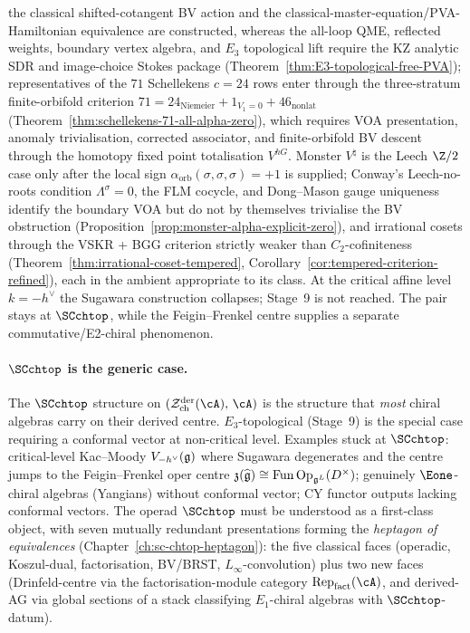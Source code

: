 the classical shifted-cotangent BV action and the
classical-master-equation/PVA-Hamiltonian equivalence are constructed,
whereas the all-loop QME, reflected weights, boundary vertex algebra,
and $E_3$ topological lift require the KZ analytic SDR and
image-choice Stokes package
(Theorem~\ref{thm:E3-topological-free-PVA}); representatives of the
$71$ Schellekens $c = 24$
rows enter through the three-stratum finite-orbifold criterion
$71 = 24_{\mathrm{Niemeier}} + 1_{V_1=0} + 46_{\mathrm{nonlat}}$
(Theorem~\ref{thm:schellekens-71-all-alpha-zero}), which requires
VOA presentation, anomaly trivialisation, corrected associator, and
finite-orbifold BV descent through the homotopy fixed point
totalisation $V^{hG}$. Monster $V^\natural$ is the Leech $\Z/2$ case only after
the local sign
$\alpha_{\mathrm{orb}}(\sigma,\sigma,\sigma)=+1$ is supplied;
Conway's Leech-no-roots condition $\Lambda^\sigma = 0$, the FLM
cocycle, and Dong--Mason gauge uniqueness identify the boundary
VOA but do not by themselves trivialise the BV obstruction
(Proposition~\ref{prop:monster-alpha-explicit-zero}),
and irrational cosets through the VSKR + BGG criterion strictly
weaker than $C_2$-cofiniteness
(Theorem~\ref{thm:irrational-coset-tempered},
Corollary~\ref{cor:tempered-criterion-refined}), each in the
ambient appropriate to its class. At the critical affine level
$k = -h^\vee$ the Sugawara construction collapses; Stage~9 is not
reached. The pair stays at $\SCchtop$, while the
Feigin--Frenkel centre supplies a separate commutative/E2-chiral
phenomenon.

\paragraph{$\SCchtop$ is the generic case.}
The $\SCchtop$ structure on
$(\cZ^{\mathrm{der}}_{\mathrm{ch}}(\cA),\,\cA)$ is the structure
that \emph{most} chiral algebras carry on their derived centre.
$E_3$-topological (Stage~9) is the special case requiring a
conformal vector at non-critical level. Examples stuck at
$\SCchtop$: critical-level Kac--Moody $V_{-h^\vee}(\mathfrak{g})$ where
Sugawara degenerates and the centre jumps to the
Feigin--Frenkel oper centre
$\mathfrak{z}(\widehat{\mathfrak{g}}) \cong
\operatorname{Fun}\operatorname{Op}_{\mathfrak{g}^L}(D^\times)$;
genuinely $\Eone$-chiral algebras (Yangians) without
conformal vector; CY functor outputs lacking conformal vectors.
The operad $\SCchtop$ must be understood as a first-class
object, with seven mutually redundant presentations forming the
\emph{heptagon of equivalences}
(Chapter~\ref{ch:sc-chtop-heptagon}): the five classical faces
(operadic, Koszul-dual, factorisation, BV/BRST,
$L_\infty$-convolution) plus two new faces (Drinfeld-centre via
the factorisation-module category
$\mathrm{Rep}_{\mathrm{fact}}(\cA)$, and derived-AG via global
sections of a stack classifying $E_1$-chiral algebras with
$\SCchtop$-datum).

